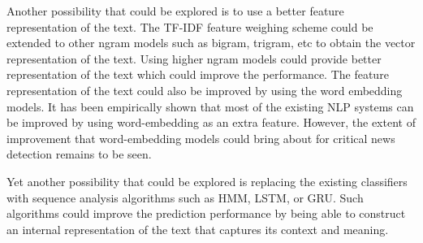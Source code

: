 Another possibility that could be explored is to use a better feature representation of the text. The TF-IDF feature weighing scheme could be extended to other ngram models such as bigram, trigram, etc to obtain the vector representation of the text. Using higher ngram models could provide better representation of the text which could improve the performance. The feature representation of the text could also be improved by using the word embedding models. It has been empirically shown that most of the existing NLP systems can be improved by using word-embedding as an extra feature\cite{turian2010word}. However, the extent of improvement that word-embedding models could bring about for critical news detection remains to be seen.

Yet another possibility that could be explored is replacing the existing classifiers with sequence analysis algorithms such as HMM\cite{baum1966statistical}, LSTM\cite{hochreiter1997long}, or GRU\cite{cho2014learning}. Such algorithms could improve the prediction performance by being able to construct an internal representation of the text that captures its context and meaning.
